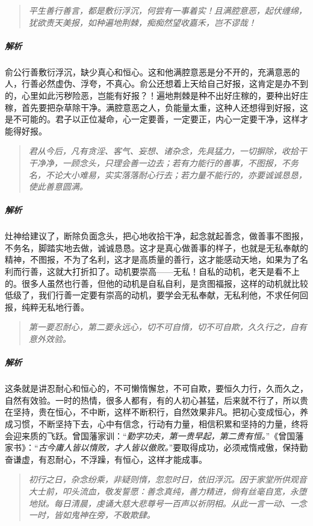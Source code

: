 \begin{quote}\it
    平生善行善言，都是敷衍浮沉，何尝有一事着实！且满腔意恶，起伏缠绵，犹欲责天美报，如种遍地荆棘，痴痴然望收嘉禾，岂不谬哉！
\end{quote}

\subparagraph{解析} 俞公行善敷衍浮沉，缺少真心和恒心。这和他满腔意恶是分不开的，充满意恶的人，行善必然虚伪、浮夸，不真心。俞公还想着上天给自己好报，这肯定是办不到的，心里如此污秽险恶，岂能有好报？！遍地荆棘是种不出好庄稼的，要种出好庄稼，首先要把杂草除干净。满腔意恶之人，负能量太重，这种人还想得到好报，这是不可能的。君子以正位凝命，心一定要善，一定要正，内心一定要干净，这样才能得好报。

\begin{quote}\it
    君从今后，凡有贪淫、客气、妄想、诸杂念，先具猛力，一切摒除，收拾干干净净，一顾念头，只理会善一边去；若有力能行的善事，不图报，不务名，不论大小难易，实实落落耐心行去；若力量不能行的，亦要诚诚恳恳，使此善意圆满。
\end{quote}

\subparagraph{解析} 灶神给建议了，断除负面念头，把心地收拾干净，起念就起善念，做善事不图报，不务名，脚踏实地去做，诚诚恳恳。这才是真心做善事的样子，也就是无私奉献的精神，不图报，不为了名利，这才是高质量的善行，这才能感动天地，如果为了名利而行善，这就大打折扣了。动机要崇高——无私！自私的动机，老天是看不上的。很多人虽然也行善，但他的动机是自私自利，是贪图福报，这样的动机就比较低级了，我们行善一定要有崇高的动机，要学会无私奉献，无私利他，不求任何回报，纯粹无私地行善。

\begin{quote}\it
    第一要忍耐心，第二要永远心，切不可自惰，切不可自欺，久久行之，自有意外效验。
\end{quote}

\subparagraph{解析} 这条就是讲忍耐心和恒心的，不可懒惰懈怠，不可自欺，要恒久力行，久而久之，自然有效验。一时的热情，很多人都有，有的人初心甚猛，后来就不行了，所以贵在坚持，贵在恒心，不中断，这样不断积行，自然效果非凡。把初心变成恒心，养成习惯，不断坚持下去，心中有信念，行动有力量，相信积累和坚持的力量，终将会迎来质的飞跃。曾国藩家训：“\textit{勤字功夫，第一贵早起，第二贵有恒。}”《曾国藩家书》：“\textit{古今庸人皆以惰败，才人皆以傲败。}”要取得成功，必须戒惰戒傲，保持勤奋谦虚，有忍耐心，不浮躁，有恒心，这样才能成事。

\begin{quote}\it
    初行之日，杂念纷乘，非疑则惰，忽忽时日，依旧浮沉。因于家堂所供观音大士前，叩头流血，敬发誓愿：善念真纯，善力精进，倘有丝毫自宽，永堕地狱。每日清晨，虔诵大慈大悲尊号一百声以祈阴相。从此一言一动、一念一时，皆如鬼神在旁，不敢欺肆。
\end{quote}

